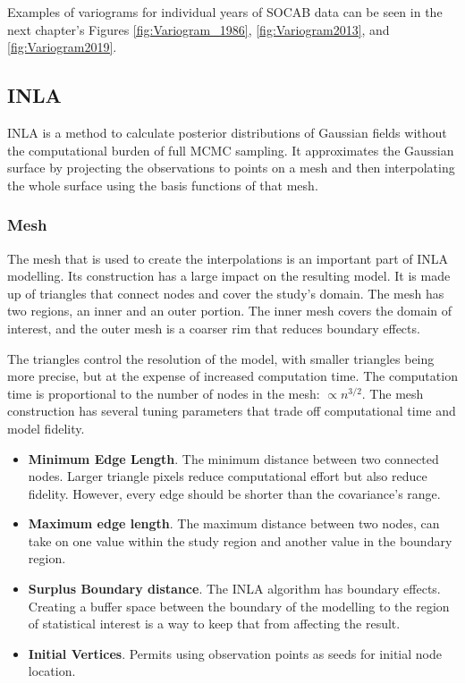 Examples of variograms for individual years of \ac{SOCAB} data can be seen in the next chapter's Figures \ref{fig:Variogram_1986}, \ref{fig:Variogram2013}, and \ref{fig:Variogram2019}.


\subsection{INLA}
\label{subsec:inla}
\ac{INLA} is a method to calculate posterior distributions of Gaussian fields without the computational burden of full \ac{MCMC} sampling. It approximates the Gaussian surface by projecting the observations to points on a mesh and then interpolating the whole surface using the basis functions of that mesh.

\subsubsection*{Mesh} \label{subsec:IntroMesh}
The mesh that is used to create the interpolations is an important part of \ac{INLA} modelling.  Its construction has a large impact on the resulting model.  It is made up of triangles that connect nodes and cover the study's domain.
The mesh has two regions, an inner and an outer portion.  The inner mesh covers the domain of interest, and the outer mesh is a coarser rim that reduces boundary effects.  

The triangles control the resolution of the model, with smaller triangles being more precise, but at the expense of increased computation time.  The computation time is proportional to the number of nodes in the mesh: $\propto n^{3/2}$.  The mesh construction has several tuning parameters that trade off computational time and model fidelity.

\begin{itemize}
	\item \textbf{Minimum Edge Length}.  The minimum distance between two connected nodes. Larger triangle pixels reduce computational effort but also reduce fidelity.  However, every edge should be shorter than the covariance's range.
	\item \textbf{Maximum edge length}.  The maximum distance between two nodes, can take on one value within the study region and another value in the boundary region. 
	\item \textbf{Surplus Boundary distance}.  The \ac{INLA} algorithm has boundary effects.  Creating a buffer space between the boundary of the modelling to the region of statistical interest is a way to keep that from affecting the result.
	\item \textbf{Initial Vertices}. Permits using observation points as seeds for initial node location.
\end{itemize}

